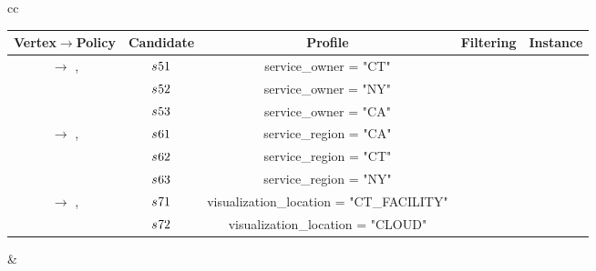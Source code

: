 \begin{example}[\bf \pipelineInstance]
\begin{table*}
{\begin{tabular}[t]{cc}
\begin{tabular}{c|c|c|c|c}
          \textbf{Vertex$\rightarrow$Policy}                   & \textbf{Candidate} & \textbf{Profile}                         & \textbf{Filtering} & \textbf{Instance} \\\hline
          \multirow{ 3}{*}{\vi{5}  $\rightarrow$ \p{1},\p{2} } & $s_{}{51}$           & service\_owner =    "CT"                 & \cmark             & \cmark            \\
                                                               & $s_{}{52}$           & service\_owner =    "NY"                 & \cmark             & \xmark            \\
                                                               & $s_{}{53}$           & service\_owner =    "CA"                 & \xmark             & \xmark            \\
          \hline
          \multirow{ 3}{*}{\vi{6}  $\rightarrow$ \p{3},\p{4} } & $s_{}{61}$           & service\_region =    "CA"                & \xmark             & \xmark            \\
                                                               & $s_{}{62}$           & service\_region =    "CT"                & \cmark             & \cmark            \\
                                                               & $s_{}{63}$           & service\_region =    "NY"                & \cmark             & \xmark            \\
          \hline
          \multirow{ 3}{*}{\vi{7}  $\rightarrow$ \p{5},\p{6} } & $s_{}{71}$           & visualization\_location = "CT\_FACILITY" & \cmark             & \cmark            \\
                                                               & $s_{}{72}$           & visualization\_location = "CLOUD"        & \cmark             & \xmark            \\
        \end{tabular}
                                   &

        \begin{tabular}{c|c}\label{tab:instance_example_maxquality}


\end{tabular}
\end{tabular}}
\end{table*}
\end{example}
